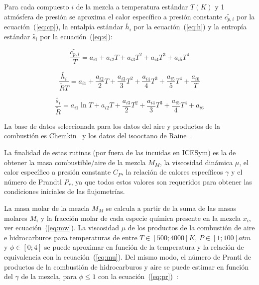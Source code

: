 Para cada compuesto $i$ de la mezcla a temperatura estándar $T(K)$ y 1 atmósfera
de presión se aproxima el calor específico a presión constante
$\widetilde{c_{p,i}}$ por la ecuación~(\ref{eq:cp}), la entalpía estándar
$\widetilde{h_{i}}$ por la ecuación~(\ref{eq:h}) y la entropía estándar
$\widetilde{s_{i}}$ por la ecuación~(\ref{eq:s}):


\begin{equation}\label{eq:cp} \frac{\widetilde{c_{p,i}}}{T} = a_{i1} + a_{i2}T + a_{i3}T^{2} + a_{i4}T^{3} + a_{i5}T^{4}
\end{equation}

\begin{equation}\label{eq:h} \frac{\widetilde{h_{i}}}{\widetilde{R}T} = a_{i1} + \frac{a_{i2}}{2}T + \frac{a_{i3}}{3}T^{2} + \frac{a_{i4}}{4}T^{3} + \frac{a_{i5}}{5}T^{4} +\frac{a_{i6}}{T}
\end{equation}

\begin{equation}\label{eq:s} \frac{\widetilde{s_{i}}}{\widetilde{R}} = a_{i1} \ln{T} + a_{i2}T + \frac{a_{i3}}{2}T^{2} + \frac{a_{i4}}{3}T^{3} + \frac{a_{i5}}{4}T^{4} + a_{i6}
\end{equation}


La base de datos seleccionada para los datos del aire y productos de la
combustión es Chemkin~\parencite{chemkin} y los datos del isooctano de
Raine~\parencite{raine}.

La finalidad de estas rutinas (por fuera de las incuidas en ICESym) es la de
obtener la masa combustible/aire de la mezcla $M_{M}$, la viscosidad dinámica
$\mu$, el calor específico a presión constante $C_{P}$, la relación de calores
específicos $\gamma$ y el número de Prandtl $P_{r}$, ya que todos estos
valores son requeridos para obtener las condiciones iniciales de las
flujometrías.

La masa molar de la mezcla $M_{M}$ se calcula a partir de la suma de las masas
molares $M_{i}$ y la fracción molar de cada especie química presente en la
mezcla $x_{i}$, ver ecuación~(\ref{eq:mw}).
%
La viscosidad $\mu$ de los productos de la combustión de aire e hidrocarburos
para temperaturas de entre $T\in [500; 4000]K$, $P\in[1; 100]atm$ y
$\phi \in [0;4]$ se puede aproximar en función de la temperatura y la relación
de equivalencia con la ecuación~(\ref{eq:mu}).
%
Del mismo modo, el número de Prantl de productos de la combustión de
hidrocarburos y aire se puede estimar en función del $\gamma$ de la mezcla, para
$\phi\leq 1$ con la ecuación~(\ref{eq:pr})~\parencite{heywood}:


